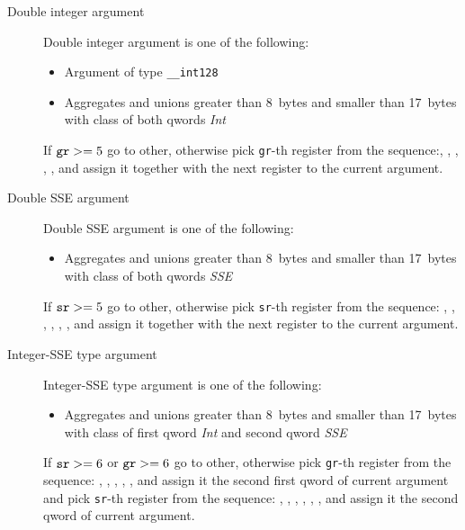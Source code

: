 \begin{description}
\begin{description}
    \item[Double integer argument]
      Double integer argument is one of the following:
      \begin{itemize}
        \item Argument of type \verb|__int128|
        \item Aggregates and unions greater than 8~bytes and smaller than 17~bytes with class of both qwords \emph{Int}
      \end{itemize}
      If $\verb|gr| >= 5$ go to other, otherwise pick \verb|gr|-th register from
      the sequence:\RAX, \RDX, \RCX, \RBX, \RSI, \RDI{} and assign it together with the
      next register to the current argument.

    \item[Double SSE argument]
      Double SSE argument is one of the following:
      \begin{itemize}
        \item Aggregates and unions greater than 8~bytes and smaller than 17~bytes with class of both qwords \emph{SSE}
      \end{itemize}
      If $\verb|sr| >= 5$ go to other, otherwise pick \verb|sr|-th register from
      the sequence: , , , , , , 
      and assign it together with the
      next register to the current argument.

    \item[Integer-SSE type argument]
      Integer-SSE type argument is one of the following:
      \begin{itemize}
        \item Aggregates and unions greater than 8~bytes and smaller than 17~bytes with class of first qword \emph{Int}
          and second qword \emph{SSE}
      \end{itemize}
      If $\verb|sr| >= 6$ or $\verb|gr| >= 6$ go to other, otherwise pick \verb|gr|-th register from
      the sequence: \RAX, \RDX, \RCX, \RBX, \RSI, \RDI{} 
      and assign it the second first qword of current argument and pick \verb|sr|-th register from
      the sequence: , , , , , , 
      and assign it the second qword of current argument.


\end{description}
\end{description}
